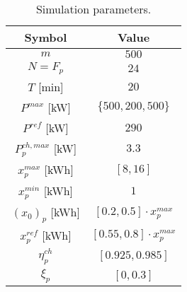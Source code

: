 \begin{table}[H]
    \centering
    \begin{tabular}{|c|c|}
        \hline
        Symbol & Value \\
        \hline
        $m$ & $500$ \\
        $N = F_p$ & $24$ \\
        $T$ [min] & $20$ \\
        $P^{max}$ [kW] & $\{500, 200, 500\}$ \\
        $P^{ref}$ [kW] & $290$ \\
        $P^{ch,max}_p$ [kW] & $3.3$ \\
        $x^{max}_p$ [kWh] & $[8, 16]$ \\
        $x^{min}_p$ [kWh] & $1$ \\
        $(x_0)_p$ [kWh] & $[0.2, 0.5] \cdot x^{max}_p$ \\
        $x^{ref}_p$ [kWh] & $[0.55, 0.8] \cdot x^{max}_p$ \\
        $\eta^{ch}_p$ & $[0.925, 0.985]$ \\
        $\xi_p$ & $[0, 0.3]$ \\
        \hline
    \end{tabular}
    \caption{Simulation parameters.}
    \label{tab:sim_param}
\end{table}
